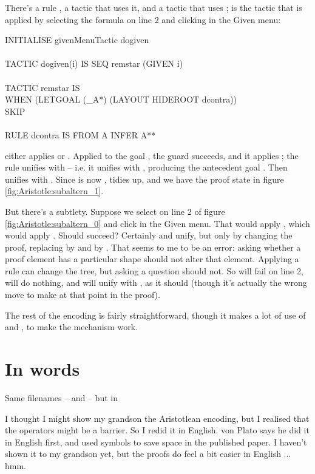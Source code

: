 There's a rule , a tactic  that uses it, and a tactic  that uses ;  is the tactic that is applied by selecting the formula on line 2 and clicking  in the Given menu:
\begin{japeish}
INITIALISE givenMenuTactic dogiven\\
\\
TACTIC dogiven(i) IS SEQ remstar (GIVEN i) \\
\\
TACTIC remstar IS \\
\tab  WHEN (LETGOAL (\_A*) (LAYOUT HIDEROOT dcontra))\\
\tab\tab\tab\tab       SKIP\\
\\       
RULE dcontra IS FROM A INFER A**
\end{japeish}
 either applies  or . Applied to the goal , the  guard succeeds, and it applies ; the rule unifies  with  -- i.e. it unifies  with , producing the antecedent goal . Then  unifies  with . Since  is now ,  tidies up, and we have the proof state in figure \ref{fig:Aristotle:subaltern_1}.

But there's a subtlety. Suppose we select  on line 2 of figure \ref{fig:Aristotle:subaltern_0} and click  in the Given menu. That would apply , which would apply . Should  succeed? Certainly  and  unify, but only by changing the proof, replacing  by  and  by . That seems to me to be an error: asking whether a proof element has a particular shape should not alter that element. Applying a rule can change the tree, but asking a question should not. So  will fail on line 2,  will do nothing, and  will unify  with , as it should (though it's actually the wrong move to make at that point in the proof).

The rest of the encoding is fairly straightforward, though it makes a lot of use of  and , to make the  mechanism work.

\section{In words}

Same filenames --  and  -- but in 

I thought I might show my grandson the Aristotlean encoding, but I realised that the operators might be a barrier. So I redid it in English. von Plato says he did it in English first, and used symbols to save space in the published paper. I haven't shown it to my grandson yet, but the proofs do feel a bit easier in English ... hmm.

